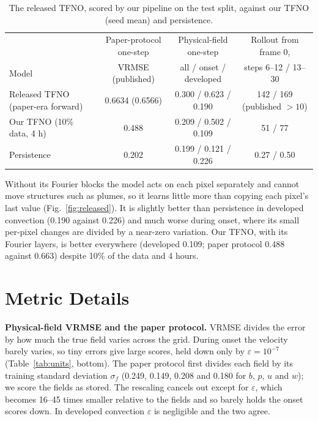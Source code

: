 \documentclass[11pt]{article}
\begin{document}
\begin{table}[!htbp]
\centering\footnotesize
\begin{tabular}{@{}lccc@{}}
\toprule
& Paper-protocol one-step & Physical-field one-step & Rollout from frame 0, \\
Model & VRMSE (published) & all / onset / developed & steps 6--12 / 13--30 \\
\midrule
Released TFNO (paper-era forward) & 0.6634 (0.6566) & 0.300 / 0.623 / 0.190 & 142 / 169 (published $>10$) \\
Our TFNO (10\% data, 4 h) & 0.488 & 0.209 / 0.502 / 0.109 & 51 / 77 \\
Persistence & 0.202 & 0.199 / 0.121 / 0.226 & 0.27 / 0.50 \\
\bottomrule
\end{tabular}
\caption{The released TFNO, scored by our pipeline on the test split, against our TFNO (seed mean) and
persistence.}
\label{tab:released_tfno}
\end{table}

Without its Fourier blocks the model acts on each pixel separately and cannot move structures such as plumes, so it
learns little more than copying each pixel's last value (Fig.~\ref{fig:released}). It is slightly better than
persistence in developed convection (0.190 against 0.226) and much worse during onset, where its small per-pixel
changes are divided by a near-zero variation. Our TFNO, with its Fourier layers, is better everywhere (developed
0.109; paper protocol 0.488 against 0.663) despite 10\% of the data and 4 hours.

\section{Metric Details}
\label{app:metrics}


\textbf{Physical-field VRMSE and the paper protocol.} VRMSE divides the error by how much the true field varies
across the grid. During onset the velocity barely varies, so tiny errors give large scores, held down only by
$\varepsilon=10^{-7}$ (Table~\ref{tab:units}, bottom). The paper protocol first divides each field by its training
standard deviation $\sigma_f$ (0.249, 0.149, 0.208 and 0.180 for $b$, $p$, $u$ and $w$); we score the fields as
stored. The rescaling cancels out except for $\varepsilon$, which becomes 16--45 times smaller relative to the
fields and so barely holds the onset scores down. In developed convection $\varepsilon$ is negligible and the two
agree.
\end{document}

